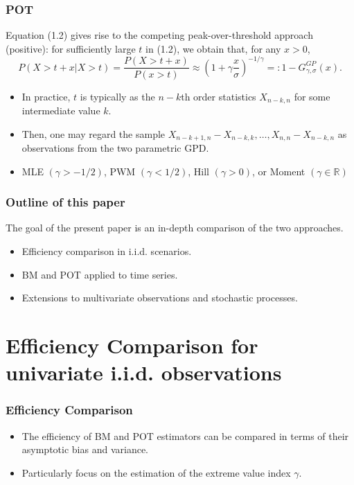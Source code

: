 \documentclass{beamer}
\begin{document}
\begin{frame}
    \frametitle{POT}
Equation (1.2) gives rise to the competing peak-over-threshold approach (positive): for sufficiently large $t$ in (1.2), we obtain that, for any $x>0$,
$$
P(X>t+x|X>t) = \frac{P(X>t+x)}{P(x>t)}\approx (1+\gamma \frac{x}{\sigma})^{-1/\gamma}=:1-G_{\gamma,\sigma}^{GP}(x).
$$
\begin{itemize}
    \item In practice, $t$ is typically as the $n-k$th order statistics $X_{n-k,n}$ for some intermediate value $k$.
    \item Then, one may regard the sample $X_{n-k+1,n}-X_{n-k,k}, \dots, X_{n,n}-X_{n-k,n}$ as observations from the two parametric GPD.
    \item  MLE $(\gamma>-1/2)$, PWM $(\gamma<1/2)$, Hill $(\gamma>0)$, or Moment $(\gamma\in \mathbb{R})$
\end{itemize}

\end{frame}

\begin{frame}
    \frametitle{Outline of this paper}
    The goal of the present paper is an in-depth comparison of the two approaches.
\begin{itemize}
    \item Efficiency comparison in i.i.d. scenarios.
    \vspace{5ex}
    \item BM and POT applied to time series.
    \vspace{5ex}
    \item Extensions to multivariate observations and stochastic processes.
\end{itemize}
    

\end{frame}

\section{Efficiency Comparison for univariate i.i.d. observations}
\begin{frame}
    \frametitle{Efficiency Comparison}
\begin{itemize}
    \item The efficiency of BM and POT estimators can be compared in terms of their asymptotic bias and
    variance.
    \item Particularly focus on the estimation of the extreme value index $\gamma$.
\end{itemize}
    

\end{frame}
\end{document}

